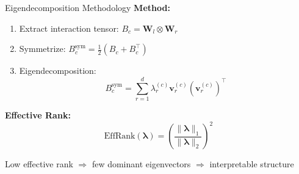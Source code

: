\begin{frame}{Eigendecomposition Methodology}
    \textbf{Method:}
    \begin{enumerate}
        \item Extract interaction tensor: $B_c = \mathbf{W}_l \otimes \mathbf{W}_r$
        \item Symmetrize: $B_c^{\text{sym}} = \frac{1}{2}(B_c + B_c^\top)$
        \item Eigendecomposition:
        \begin{equation*}
            B_c^{\text{sym}} = \sum_{r=1}^{d} \lambda_r^{(c)} \mathbf{v}_r^{(c)} (\mathbf{v}_r^{(c)})^\top
        \end{equation*}
    \end{enumerate}
    
    \vspace{0.3cm}
    \textbf{Effective Rank:}
    \begin{equation*}
        \text{EffRank}(\boldsymbol{\lambda}) = \left( \frac{\|\boldsymbol{\lambda}\|_1}{\|\boldsymbol{\lambda}\|_2} \right)^2
    \end{equation*}
    
    \footnotesize
    Low effective rank $\Rightarrow$ few dominant eigenvectors $\Rightarrow$ interpretable structure
\end{frame}
